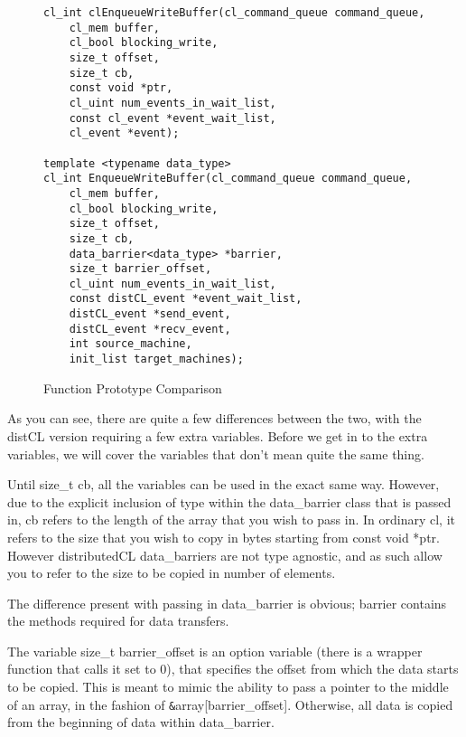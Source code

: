 \documentclass[../thesis.tex]{subfiles}
\begin{document}
            \begin{figure}[htbp]
                \centering
                \lstset{language=cpp}
                \begin{lstlisting}[tabsize=2]
cl_int clEnqueueWriteBuffer(cl_command_queue command_queue,
    cl_mem buffer,
    cl_bool blocking_write,
    size_t offset,
    size_t cb,
    const void *ptr,
    cl_uint num_events_in_wait_list,
    const cl_event *event_wait_list,
    cl_event *event);

template <typename data_type>
cl_int EnqueueWriteBuffer(cl_command_queue command_queue,
    cl_mem buffer,
    cl_bool blocking_write,
    size_t offset,
    size_t cb,
    data_barrier<data_type> *barrier,
    size_t barrier_offset,
    cl_uint num_events_in_wait_list,
    const distCL_event *event_wait_list,
    distCL_event *send_event,
    distCL_event *recv_event,
    int source_machine,
    init_list target_machines);
                \end{lstlisting}
            \caption{Function Prototype Comparison}
            \label{fig:function_proto_compare_write}
            \end{figure}

            As you can see, there are quite a few differences between the two, with the distCL version requiring a few extra variables. Before we get in to the extra variables, we will cover the variables that don't mean quite the same thing.

            Until size\_t cb, all the variables can be used in the exact same way. However, due to the explicit inclusion of type within the data\_barrier class that is passed in, cb refers to the length of the array that you wish to pass in. In ordinary cl, it refers to the size that you wish to copy in bytes starting from const void *ptr. However distributedCL data\_barriers are not type agnostic, and as such allow you to refer to the size to be copied in number of elements.

            The difference present with passing in data\_barrier is obvious; barrier contains the methods required for data transfers.

            The variable size\_t barrier\_offset is an option variable (there is a wrapper function that calls it set to 0), that specifies the offset from which the data starts to be copied. This is meant to mimic the ability to pass a pointer to the middle of an array, in the fashion of \texttt{\&}array[barrier\_offset]. Otherwise, all data is copied from the beginning of data within data\_barrier.
\end{document}
